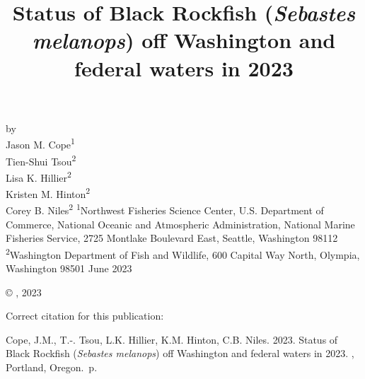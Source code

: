 \documentclass[11pt,
  english,
  letterpaper,
]{article}
\date{}
\newcommand{\trTitle}{Status of Black Rockfish (\emph{Sebastes melanops}) off Washington and federal waters in 2023}
\newcommand{\trYear}{2023}
\newcommand{\trMonth}{June}
\newcommand{\trAuthsBack}{Cope, J.M., T.-. Tsou, L.K. Hillier, K.M. Hinton, C.B. Niles}
\newcommand{\trCitation}{
\begin{hangparas}{1em}{1}
\trAuthsBack{}. \trYear{}. \trTitle{}. \glsentrylong{pfmc}, Portland, Oregon. \pageref{LastPage}{}\,p.
\end{hangparas}}
\begin{document}

\renewcommand*{\thefootnote}{\fnsymbol{footnote}}

\small
\thispagestyle{empty}
\noindent
\begin{center}
\title{Status of Black Rockfish (\emph{Sebastes melanops}) off Washington and federal waters in 2023}
\vspace{1.5cm}
{\Large\textbf{}}
\vfill
by\\
Jason M. Cope\textsuperscript{1}\\
Tien-Shui Tsou\textsuperscript{2}\\
Lisa K. Hillier\textsuperscript{2}\\
Kristen M. Hinton\textsuperscript{2}\\
Corey B. Niles\textsuperscript{2}\vfill
\textsuperscript{1}Northwest Fisheries Science Center, U.S. Department of Commerce, National Oceanic and Atmospheric Administration, National Marine Fisheries Service, 2725 Montlake Boulevard East, Seattle, Washington 98112\\
\textsuperscript{2}Washington Department of Fish and Wildlife, 600 Capital Way North, Olympia, Washington 98501\vfill
\trMonth{} \trYear{}
\end{center}
\clearpage

\thispagestyle{empty}
\vspace*{\fill}
\begin{center}
\copyright{} , \trYear{}\\
\end{center}
\par
\bigskip
\noindent
Correct citation for this publication:
\bigskip
\par
\trCitation{}
\clearpage


\tableofcontents\clearpage
\label{TRlastRoman}
\clearpage

\newpage
\thispagestyle{empty} %

\pagestyle{plain}  %
\renewcommand*{\thefootnote}{\arabic{footnote}}  %
\setcounter{footnote}{0}  %
\renewcommand{\headrulewidth}{0.5pt}
\renewcommand{\footrulewidth}{0.5pt}
\end{document}
